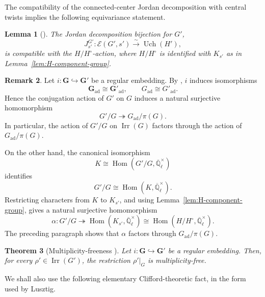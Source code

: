 \documentclass{amsart}
\theoremstyle{plain}
\numberwithin{equation}{section}
\newtheorem{theorem}{Theorem}[section]
\newtheorem{lemma}[theorem]{Lemma}
\theoremstyle{definition}
\newtheorem{remark}[theorem]{Remark}
\newcommand{\cE}{\mathcal{E}}
\newcommand{\Qlcl}{\overline{\mathbb{Q}}_{\ell}}
\newcommand{\Hom}{\operatorname{Hom}}
\newcommand{\Irr}{\operatorname{Irr}}
\newcommand{\Uch}{\operatorname{Uch}}
\newcommand{\ad}{\operatorname{ad}}
\newcommand{\bG}{\mathbf{G}}
\begin{document}
The compatibility of the connected-center Jordan decomposition with central
twists implies the following equivariance statement.

\begin{lemma}[{\cite[Proposition~8.1]{Lus88}}]
\label{lem:regular-embedding-JD-equivariance}
The Jordan decomposition bijection for \(G'\),
\[
J_{s'}^{G'}:\cE(G',s')\xrightarrow{\sim}\Uch(H'),
\]
is compatible with the \(H/H^\circ\)-action, where \(H/H^\circ\) is identified
with \(K_{s'}\) as in Lemma~\ref{lem:H-component-group}.
\end{lemma}

\begin{remark}\label{rmk:regular-embedding-adjoint-action}
Let \(i:\bG\hookrightarrow \bG'\) be a regular embedding.  By
\cite[Remark~1.7.6]{Book:GeckandMalle}, \(i\) induces isomorphisms
\[
\bG_{\ad}\cong \bG'_{\ad},
\qquad
G_{\ad}\cong G'_{\ad}.
\]
Hence the conjugation action of \(G'\) on \(G\) induces a natural surjective
homomorphism
\[
G'/G \twoheadrightarrow G_{\ad}/\pi(G).
\]
In particular, the action of \(G'/G\) on \(\Irr(G)\) factors through the
action of \(G_{\ad}/\pi(G)\).

On the other hand, the canonical isomorphism
\[
K\cong \Hom(G'/G,\Qlcl^\times)
\]
identifies
\[
G'/G \cong \Hom(K,\Qlcl^\times).
\]
Restricting characters from \(K\) to \(K_{s'}\), and using
Lemma~\ref{lem:H-component-group}, gives a natural surjective homomorphism
\[
\alpha:G'/G
\twoheadrightarrow
\Hom(K_{s'},\Qlcl^\times)
\cong
\Hom(H/H^\circ,\Qlcl^\times).
\]
The preceding paragraph shows that \(\alpha\) factors through
\(G_{\ad}/\pi(G)\).
\end{remark}

\begin{theorem}[Multiplicity-freeness {\cite[\S 10]{Lus88}}]
Let \(i:\bG\hookrightarrow \bG'\) be a regular embedding.  Then, for every
\(\rho'\in\Irr(G')\), the restriction \(\rho'|_G\) is multiplicity-free.
\end{theorem}

We shall also use the following elementary Clifford-theoretic fact, in the
form used by Lusztig.
\end{document}
